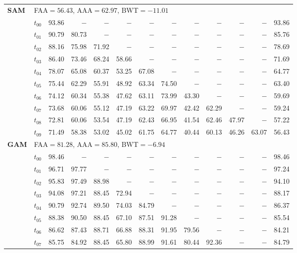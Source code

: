 \begin{table}[ht]
\begin{tabular}{@{}l l r r r r r r r r r r r@{}}
\multirow{11}{*}{\textbf{SAM}} & \multicolumn{12}{l}{\quad\small FAA$=56.43$,\; AAA$=62.97$,\; BWT$=-11.01$} \\
 & $t_{00}$ & 93.86 & $-$ & $-$ & $-$ & $-$ & $-$ & $-$ & $-$ & $-$ & $-$ & 93.86 \\
 & $t_{01}$ & 90.79 & 80.73 & $-$ & $-$ & $-$ & $-$ & $-$ & $-$ & $-$ & $-$ & 85.76 \\
 & $t_{02}$ & 88.16 & 75.98 & 71.92 & $-$ & $-$ & $-$ & $-$ & $-$ & $-$ & $-$ & 78.69 \\
 & $t_{03}$ & 86.40 & 73.46 & 68.24 & 58.66 & $-$ & $-$ & $-$ & $-$ & $-$ & $-$ & 71.69 \\
 & $t_{04}$ & 78.07 & 65.08 & 60.37 & 53.25 & 67.08 & $-$ & $-$ & $-$ & $-$ & $-$ & 64.77 \\
 & $t_{05}$ & 75.44 & 62.29 & 55.91 & 48.92 & 63.34 & 74.50 & $-$ & $-$ & $-$ & $-$ & 63.40 \\
 & $t_{06}$ & 74.12 & 60.34 & 55.38 & 47.62 & 63.11 & 73.99 & 43.30 & $-$ & $-$ & $-$ & 59.69 \\
 & $t_{07}$ & 73.68 & 60.06 & 55.12 & 47.19 & 63.22 & 69.97 & 42.42 & 62.29 & $-$ & $-$ & 59.24 \\
 & $t_{08}$ & 72.81 & 60.06 & 53.54 & 47.19 & 62.43 & 66.95 & 41.54 & 62.46 & 47.97 & $-$ & 57.22 \\
 & $t_{09}$ & 71.49 & 58.38 & 53.02 & 45.02 & 61.75 & 64.77 & 40.44 & 60.13 & 46.26 & 63.07 & 56.43 \\
\midrule
\multirow{11}{*}{\textbf{GAM}} & \multicolumn{12}{l}{\quad\small FAA$=81.28$,\; AAA$=85.80$,\; BWT$=-6.94$} \\
 & $t_{00}$ & 98.46 & $-$ & $-$ & $-$ & $-$ & $-$ & $-$ & $-$ & $-$ & $-$ & 98.46 \\
 & $t_{01}$ & 96.71 & 97.77 & $-$ & $-$ & $-$ & $-$ & $-$ & $-$ & $-$ & $-$ & 97.24 \\
 & $t_{02}$ & 95.83 & 97.49 & 88.98 & $-$ & $-$ & $-$ & $-$ & $-$ & $-$ & $-$ & 94.10 \\
 & $t_{03}$ & 94.08 & 97.21 & 88.45 & 72.94 & $-$ & $-$ & $-$ & $-$ & $-$ & $-$ & 88.17 \\
 & $t_{04}$ & 90.79 & 92.74 & 89.50 & 74.03 & 84.79 & $-$ & $-$ & $-$ & $-$ & $-$ & 86.37 \\
 & $t_{05}$ & 88.38 & 90.50 & 88.45 & 67.10 & 87.51 & 91.28 & $-$ & $-$ & $-$ & $-$ & 85.54 \\
 & $t_{06}$ & 86.62 & 87.43 & 88.71 & 66.88 & 88.31 & 91.95 & 79.56 & $-$ & $-$ & $-$ & 84.21 \\
 & $t_{07}$ & 85.75 & 84.92 & 88.45 & 65.80 & 88.99 & 91.61 & 80.44 & 92.36 & $-$ & $-$ & 84.79 \\

\end{tabular}
\end{table}
